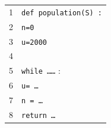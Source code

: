 \begin{enumerate}
\begin{minipage}{0.58\linewidth}
\end{minipage}\hfill
\begin{minipage}{0.38\linewidth}
\begin{tabular}{|c l|}\hline
1&\texttt{def population(S) :}\\
2&\quad \texttt{n=0}\\
3&\quad \texttt{u=2000}\\
4& \\
5&\quad \texttt{while \ldots\ldots} :\\
6&\quad \quad \texttt{u= \ldots}\\
7&\quad \quad \texttt{n = \ldots}\\
8&\quad \texttt{return \ldots}\\ \hline
\end{tabular}
\end{minipage}
\end{enumerate}

\bigskip
